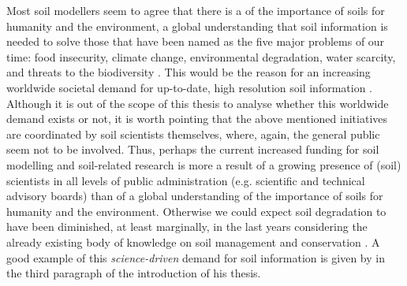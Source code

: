 Most soil modellers seem to agree that there is a  of the importance
of soils for humanity and the environment, a global understanding that soil information is needed to solve
those that have been named as the five major problems of our time: food insecurity, climate change,
environmental degradation, water scarcity, and threats to the biodiversity \cite{SanchezEtAl2009}.
This  would be the reason for an increasing worldwide societal demand for
up-to-date, high resolution soil information \cite{OmutoEtAl2013}. Although it is out of the scope
of this thesis to analyse whether this worldwide demand exists or not, it is worth pointing that the above
mentioned initiatives are coordinated by soil scientists themselves, where, again, the general
public seem not to be involved. Thus, perhaps the current increased funding for soil modelling and
soil-related research is more a result of a growing presence of (soil) scientists in all levels of
public administration (e.g. scientific and technical advisory boards) than of a global understanding
of the importance of soils for humanity and the environment. Otherwise we could expect soil
degradation to have been diminished, at least marginally, in the last years considering the already
existing body of knowledge on soil management and conservation \cite{Blanco-CanquiEtAl2010}. A good
example of this \emph{science-driven} demand for soil information is given by  in the
third paragraph of the introduction of his thesis.

